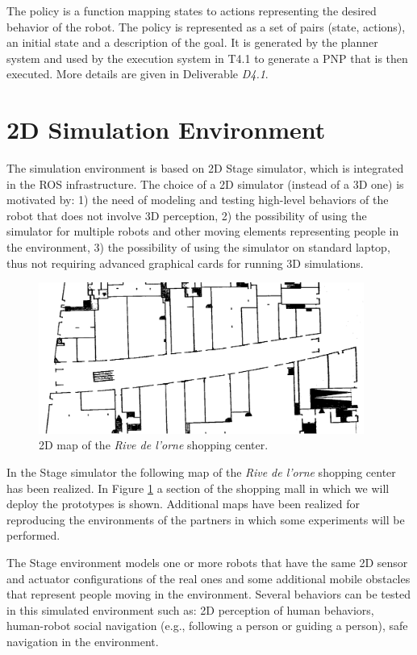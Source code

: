 \documentclass{article}
\begin{document}
The policy is a function mapping states to actions representing the desired behavior of the robot. The policy is represented as a set of pairs (state, actions), an initial state and a description of the goal. It is generated by the planner system and used by the execution system in T4.1 to generate a PNP that is then executed.
More details are given in Deliverable \emph{D4.1}.



\section{2D Simulation Environment}

The simulation environment is based on 2D Stage simulator, which is integrated in the ROS infrastructure. The choice of a 2D simulator (instead of a 3D one) is motivated by: 1) the need of modeling and testing high-level behaviors of the robot that does not involve 3D perception, 2) the possibility of using the simulator for multiple robots and other moving elements representing people in the environment, 3) the possibility of using the simulator on standard laptop, thus not requiring advanced graphical cards for running 3D simulations.

\begin{figure}
\includegraphics[width=0.95\textwidth]{Rive1.png}
\caption{2D map of the \emph{Rive de l'orne} shopping center.}
\label{fig:stage}
\end{figure}


In the Stage simulator the following map of the \emph{Rive de l'orne} shopping center has been realized. In Figure \ref{fig:stage} a section of the shopping mall in which we will deploy the prototypes is shown.
Additional maps have been realized for reproducing the environments of the partners in which some experiments will be performed.

The Stage environment models one or more robots that have the same 2D sensor and actuator configurations of the real ones and some additional mobile obstacles that represent people moving in the environment. Several behaviors can be tested in this simulated environment such as: 2D perception of human behaviors, human-robot social navigation (e.g., following a person or guiding a person), safe navigation in the environment.
\end{document}

